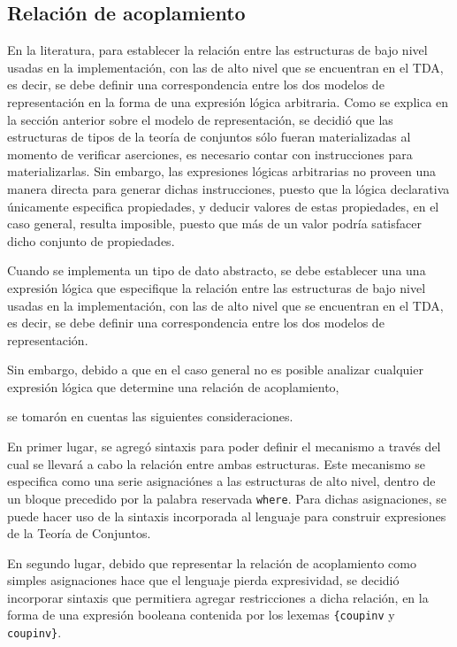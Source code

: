 \subsection{Relación de acoplamiento}

En la literatura, para establecer la relación entre las estructuras de bajo
nivel usadas en la implementación, con las de alto nivel que se encuentran en el
TDA, es decir, se debe definir una correspondencia entre los dos modelos de
representación en la forma de una expresión lógica arbitraria. Como se explica
en la sección anterior sobre el modelo de representación, se decidió que las
estructuras de tipos de la teoría de conjuntos sólo fueran materializadas al
momento de verificar aserciones, es necesario contar con instrucciones para
materializarlas. Sin embargo, las expresiones lógicas arbitrarias no proveen una
manera directa para generar dichas instrucciones, puesto que la lógica
declarativa únicamente especifica propiedades, y deducir valores de estas
propiedades, en el caso general, resulta imposible, puesto que más de un valor
podría satisfacer dicho conjunto de propiedades. 




Cuando se implementa un tipo de dato abstracto, se debe establecer una una
expresión lógica que especifique la relación entre las estructuras de bajo
nivel usadas en la implementación, con las de alto nivel que se encuentran en
el TDA, es decir, se debe definir una correspondencia entre los dos modelos de
representación.


Sin embargo, debido a que en el caso general no es posible
analizar cualquier expresión lógica que determine una relación de
acoplamiento,

se tomarón en cuentas las siguientes consideraciones.



En primer lugar, se agregó sintaxis para poder definir el mecanismo a través
del cual se llevará a cabo la relación entre ambas estructuras. Este mecanismo
se especifica como una serie asignaciónes a las estructuras de alto nivel,
dentro de un bloque precedido por la palabra reservada \texttt{where}. Para
dichas asignaciones, se puede hacer uso de la sintaxis incorporada al lenguaje
para construir expresiones de la Teoría de Conjuntos.

En segundo lugar, debido que representar la relación de acoplamiento como
simples asignaciones hace que el lenguaje pierda expresividad, se decidió
incorporar sintaxis que permitiera agregar restricciones a dicha relación, en
la forma de una expresión booleana contenida por los lexemas
\texttt{\{coupinv} y \texttt{coupinv\}}.



